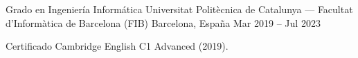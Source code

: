 
\begin{cventries}

\cventry
{Grado en Ingeniería Informática}
{Universitat Politècnica de Catalunya --- Facultat d'Informàtica de Barcelona (FIB)}
{Barcelona, España}
{Mar 2019 -- Jul 2023}
{
  \begin{cvitems}
    \item {Certificado Cambridge English C1 Advanced (2019).}
  \end{cvitems}
}
\end{cventries}